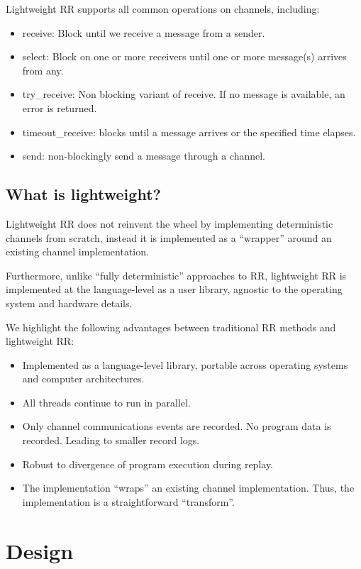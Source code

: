 \documentclass{article}
\begin{document}
Lightweight RR supports all common operations on channels, including:
\begin{itemize}
\item receive: Block until we receive a message from a sender.
\item select: Block on one or more receivers until one or more message(s) arrives from any.
\item try\_receive: Non blocking variant of receive. If no message is available, an
  error is returned.
\item timeout\_receive: blocks until a message arrives or the specified time elapses.
\item send: non-blockingly send a message through a channel.
\end{itemize}

\subsection{What is lightweight?}
Lightweight RR does not reinvent the wheel by implementing deterministic channels from
scratch, instead it is implemented as a ``wrapper'' around an existing channel
implementation.

Furthermore, unlike ``fully deterministic'' approaches to RR, lightweight RR is
implemented at the language-level as a user library, agnostic to the operating system and
hardware details.

We highlight the following advantages between traditional RR methods and lightweight RR:
\begin{itemize}
\item Implemented as a language-level library, portable across operating systems and
  computer architectures.
\item All threads continue to run in parallel.
\item Only channel communications events are recorded. No program data is recorded.
  Leading to smaller record logs.
\item Robust to divergence of program execution during replay.
\item The implementation ``wraps'' an existing channel implementation. Thus, the
  implementation is a straightforward ``transform''.
\end{itemize}

\section{Design}
\end{document}
